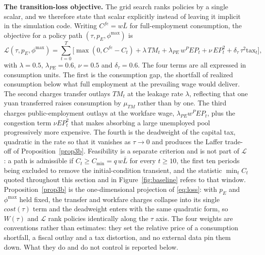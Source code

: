 \documentclass[review,12pt]{elsarticle}
\theoremstyle{plain}
\theoremstyle{definition}
\theoremstyle{remark}
\newcommand{\barL}{\bar{L}}
\begin{document}
\smallskip\noindent\textbf{The transition-loss objective.}
The grid search ranks policies by a single scalar, and we therefore state that scalar explicitly instead of leaving it implicit in the simulation code. Writing $C^{fe}=w\barL$ for full-employment consumption, the objective for a policy path $(\tau,p_E,\phi^{\max})$ is
\begin{equation}
\mathcal{L}(\tau,p_E,\phi^{\max})
=\sum_{t=0}^{T}\Big[
\max(0,C^{fe}-C_t)
+\lambda\,TM_t
+\lambda_{PE}\,w^{P}EP_t+\nu\,EP_t^{2}
+\delta_\tau\,\tau^{2}\text{tax}_t
\Big],
\label{eq:loss}
\end{equation}
with $\lambda=0.5$, $\lambda_{PE}=0.6$, $\nu=0.5$ and $\delta_\tau=0.6$.
The four terms are all expressed in consumption units. The first is the consumption gap, the shortfall of realized consumption below what full employment at the prevailing wage would deliver. The second charges transfer outlays $TM_t$ at the leakage rate $\lambda$, reflecting that one yuan transferred raises consumption by $\mu_{TM}$ rather than by one. The third charges public-employment outlays at the workfare wage, $\lambda_{PE}w^{P}EP_t$, plus the congestion term $\nu EP_t^{2}$ that makes absorbing a large unemployed pool progressively more expensive. The fourth is the deadweight of the capital tax, quadratic in the rate so that it vanishes as $\tau\to0$ and produces the Laffer trade-off of Proposition~\ref{prop3b}.
Feasibility is a separate criterion and is not part of $\mathcal{L}$: a path is admissible if $C_t\ge C_{\min}=q\,w\barL$ for every $t\ge10$, the first ten periods being excluded to remove the initial-condition transient, and the statistic $\min_tC_t$ quoted throughout this section and in Figure~\ref{fig:baseline} refers to that window.
Proposition~\ref{prop3b} is the one-dimensional projection of \eqref{eq:loss}: with $p_E$ and $\phi^{\max}$ held fixed, the transfer and workfare charges collapse into its single $cost(\tau)$ term and the deadweight enters with the same quadratic form, so $W(\tau)$ and $\mathcal{L}$ rank policies identically along the $\tau$ axis.
The four weights are conventions rather than estimates: they set the relative price of a consumption shortfall, a fiscal outlay and a tax distortion, and no external data pin them down. What they do and do not control is reported below.
\end{document}
